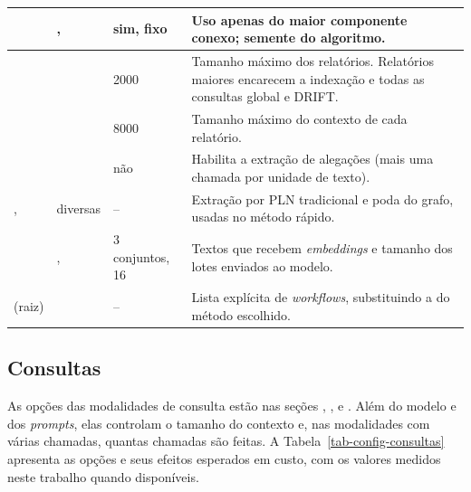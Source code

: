 \begin{longtable}{L{3.2cm} L{2.6cm} L{1.5cm} L{6.6cm}}
 & \footnotesize {},  & \footnotesize sim, fixo & \footnotesize Uso apenas do maior componente conexo; semente do algoritmo. \\
\midrule
\footnotesize {} & \footnotesize {} & \footnotesize 2000 & \footnotesize Tamanho máximo dos relatórios. Relatórios maiores encarecem a indexação e todas as consultas global e DRIFT. \\
 & \footnotesize {} & \footnotesize 8000 & \footnotesize Tamanho máximo do contexto de cada relatório. \\
\midrule
\footnotesize {} & \footnotesize {} & \footnotesize não & \footnotesize Habilita a extração de alegações (mais uma chamada por unidade de texto). \\
\midrule
\footnotesize {},  & \footnotesize diversas & \footnotesize -- & \footnotesize Extração por PLN tradicional e poda do grafo, usadas no método rápido. \\
\midrule
\footnotesize {} & \footnotesize {},  & \footnotesize 3 conjuntos, 16 & \footnotesize Textos que recebem \textit{embeddings} e tamanho dos lotes enviados ao modelo. \\
\midrule
\footnotesize (raiz) & \footnotesize {} & \footnotesize -- & \footnotesize Lista explícita de \textit{workflows}, substituindo a do método escolhido. \\
\end{longtable}

\subsection{Consultas}
\label{sec-graphrag-config-consultas}

As opções das modalidades de consulta estão nas seções , ,  e . Além do modelo e dos \textit{prompts}, elas controlam o tamanho do contexto e, nas modalidades com várias chamadas, quantas chamadas são feitas. A Tabela~\ref{tab-config-consultas} apresenta as opções e seus efeitos esperados em custo, com os valores medidos neste trabalho quando disponíveis.


